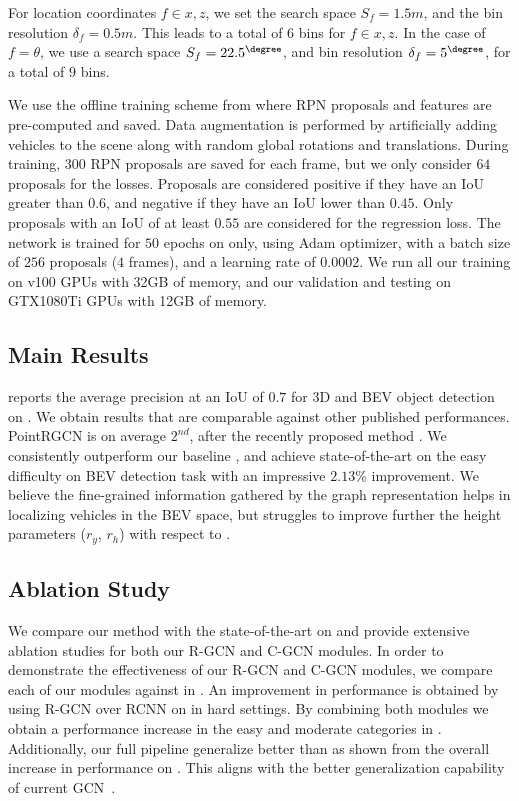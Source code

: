 \documentclass[10pt,twocolumn,letterpaper]{article}
\begin{document}
For location coordinates $f \in {x,z}$, we set the search space $S_f = 1.5m$, and the bin resolution $\delta_f = 0.5m$.
This leads to a total of $6$ bins for $f \in {x,z}$.
In the case of $f = \theta$, we use a search space $S_f = 22.5^\degree$, and bin resolution $\delta_f = 5^\degree $, for a total of $9$ bins.


We use the offline training scheme from \cite{shi2019pointrcnn} where RPN proposals and features are pre-computed and saved.
Data augmentation is performed by artificially adding vehicles to the scene along with random global rotations and translations.
During training, $300$ RPN proposals are saved for each frame, but we only consider $64$ proposals for the losses.
Proposals are considered positive if they have an IoU greater than $0.6$, and negative if they have an IoU lower than $0.45$.
Only proposals with an IoU of at least $0.55$ are considered for the regression loss.
The network is trained for $50$ epochs on \KITTItrain only, using Adam optimizer, with a batch size of $256$ proposals (\ie $4$ frames), and a learning rate of $0.0002$.
We run all our training on v100 GPUs with 32GB of memory, and our validation and testing on GTX1080Ti GPUs with 12GB of memory.


\subsection{Main Results}

 reports the average precision at an IoU of $0.7$ for 3D and BEV object detection on \KITTItest.
We obtain results that are comparable against other published performances.
PointRGCN is on average $2^{nd}$, after the recently proposed method \STD.
We consistently outperform our baseline \PointRCNN, and achieve state-of-the-art on the easy difficulty on BEV detection task with an impressive $2.13\%$ improvement.
We believe the fine-grained information gathered by the graph representation helps in localizing vehicles in the BEV space, but struggles to improve further the height parameters (\ie $r_y$, $r_h$) with respect to \PointRCNN.



\subsection{Ablation Study}

We compare our method with the state-of-the-art on \KITTIval and provide extensive ablation studies for both our R-GCN and C-GCN modules.
In order to demonstrate the effectiveness of our R-GCN and C-GCN modules, we compare each of our modules against \PointRCNN in .
An improvement in performance is obtained by using R-GCN over RCNN on \KITTIval in hard settings.
By combining both modules we obtain a performance increase in the easy and moderate categories in \KITTIval.
Additionally, our full pipeline generalize better than \PointRCNN as shown from the overall increase in performance on \KITTItest.
This aligns with the better generalization capability of current GCN~\cite{li2019deepgcns_journal}.
\end{document}
